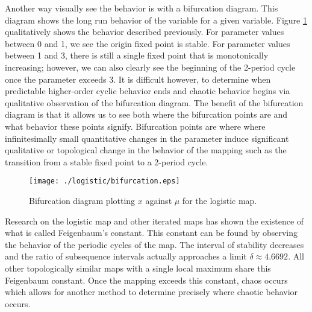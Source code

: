Another way visually see the behavior is with a bifurcation diagram. This diagram shows the long run behavior of the variable for a given variable. Figure \ref{log_bifurcation} qualitatively shows the behavior described previously. For parameter values between 0 and 1, we see the origin fixed point is stable. For parameter values between 1 and 3, there is still a single fixed point that is monotonically increasing; however, we can also clearly see the beginning of the 2-period cycle once the parameter exceeds 3. It is difficult however, to determine when predictable higher-order cyclic behavior ends and chaotic behavior begins via qualitative observation of the bifurcation diagram. The benefit of the bifurcation diagram is that it allows us to see both where the bifurcation points are and what behavior these points signify. Bifurcation points are where where infinitesimally small quantitative changes in the parameter induce significant qualitative or topological change in the behavior of the mapping such as the transition from a stable fixed point to a 2-period cycle. 
\begin{figure}
    \centering
    \texttt{[image: ./logistic/bifurcation.eps]}
    \caption{Bifurcation diagram plotting $x$ against $\mu$ for the logistic map.}
    \label{log_bifurcation}
\end{figure}

Research on the logistic map and other iterated maps has shown the existence of what is called Feigenbaum's constant. This constant can be found by observing the behavior of the periodic cycles of the map. The interval of stability decreases and the ratio of subsequence intervals actually approaches a limit $\delta\approx4.6692$\autocite{Puu2003}. All other topologically similar maps with a single local maximum share this Feigenbaum constant. Once the mapping exceeds this constant, chaos occurs which allows for another method to determine precisely where chaotic behavior occurs. 

